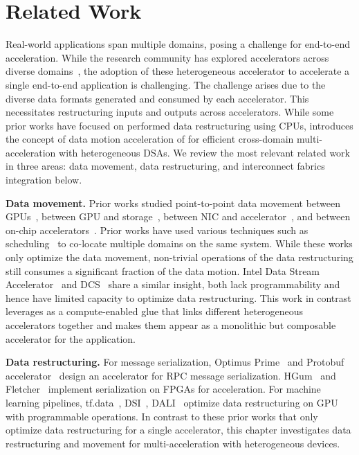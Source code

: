 \section{Related Work}
\label{sec:related}
%
Real-world applications span multiple domains, posing a challenge for end-to-end acceleration.
%
While the research community has explored accelerators across diverse domains~\cite{q100:asplos:2014, meet-the-walkers:isca:2013, doppiodb:fpl:2017,chiosa:pvldb:2022, acc-yolov3:iscas:2020, wfa:fpl:2021, genstore:asplos:2022, segram:isca:2022, meet-the-walkers:isca:2013,murray:micro:2016,robox:isca:2018,pointacc:micro:2021,robomorphic:asplos:2021}, the adoption of these heterogeneous accelerator to accelerate a single end-to-end application is challenging.
%
The challenge arises due to the diverse data formats generated and consumed by each accelerator.
%
This necessitates restructuring inputs and outputs across accelerators. 
%
While some prior works have focused on performed data restructuring using CPUs, \dmx introduces the concept of data motion acceleration of for efficient cross-domain multi-acceleration with heterogeneous DSAs.
%
We review the most relevant related work in three areas: data movement, data restructuring, and interconnect fabrics integration below.
%

\noindent \textbf{Data movement.}
%
Prior works studied point-to-point data movement between GPUs~\cite{gpudirect:2019}, between GPU and storage~\cite{morpheus:isca:2016,spin:atc:2017,nds:micro:2021}, between NIC and accelerator~\cite{p2pdma:apsys:2020,lynx:asplos:2020,flexdriver:asplos:2022}, and between on-chip accelerators~\cite{arc:dac:2012}. 
%
Prior works have used various techniques such as scheduling~\cite{wisefuse:sigmetrics:2022, mahapatra:mlarchsys:2022, paragon:asplos:2013, lynx:asplos:2020,flexdriver:asplos:2022} to co-locate multiple domains on the same system. 
%
While these works only optimize the data movement, non-trivial operations of the data restructuring still consumes a significant fraction of the data motion.
%
Intel Data Stream Accelerator~\cite{intel-dsa} and DCS~\cite{dcs:micro:2015, dcs-ctrl:isca:2018} share a similar insight, both lack programmability and hence have limited capacity to optimize data restructuring.
%
This work in contrast leverages \drxs as a compute-enabled glue that links different heterogeneous accelerators together and makes them appear as a monolithic but composable accelerator for the application.
%

\noindent \textbf{Data restructuring.}
%
For message serialization, Optimus Prime~\cite{optimusprime:asplos:2020} and Protobuf accelerator~\cite{protobuf:isca:2021} design an accelerator for RPC message serialization.
%
HGum~\cite{hgum:reconfig:2017} and Fletcher~\cite{peltenburg-2019-fletcher} implement serialization on FPGAs for acceleration.
%
For machine learning pipelines, tf.data~\cite{tf.data:pvldb:2021}, DSI~\cite{dsi-dlrm:isca:2022}, DALI~\cite{nvidia-dali:2018} optimize data restructuring on GPU with programmable operations.
%
In contrast to these prior works that only optimize data restructuring for a single accelerator, this chapter investigates data restructuring and movement for multi-acceleration with heterogeneous devices.
%

